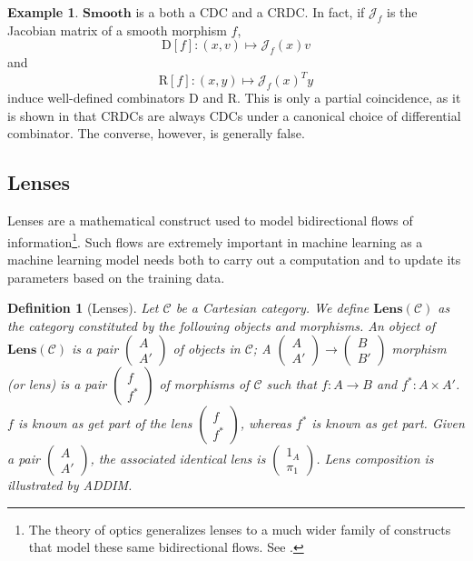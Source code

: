 \documentclass[11pt,a4paper,openright,twoside]{report}
\theoremstyle{plain}
\newtheorem{definition}[proposition]{Definition}
\theoremstyle{definition}
\newtheorem{example}[proposition]{Example}
\begin{document}
\begin{example}
  $\mathbf{Smooth}$ is a both a CDC and a CRDC. In fact, if $\mathcal{J}_f$ is the Jacobian matrix of a smooth morphism $f$,
  \[\mathrm{D}[f]: (x,v) \mapsto \mathcal{J}_f(x)v\]
  and
  \[\mathrm{R}[f]: (x,y) \mapsto \mathcal{J}_f(x)^Ty\]
  induce well-defined combinators $\mathrm{D}$ and $\mathrm{R}$. This is only a partial coincidence, as it is shown in \cite{cockettReverseDerivativeCategories2019} that CRDCs are always CDCs under a canonical choice of differential combinator. The converse, however, is generally false.
\end{example}



\subsection{Lenses}\label{subsec: lenses}

Lenses are a mathematical construct used to model bidirectional flows of information\footnote{The theory of optics generalizes lenses to a much wider family of constructs that model these same bidirectional flows. See \cite{rileyCategoriesOptics2018}.}. Such flows are extremely important in machine learning as a machine learning model needs both to carry out a computation and to update its parameters based on the training data.

\begin{definition}[Lenses]
  Let $\mathcal{C}$ be a Cartesian category. We define $\mathbf{Lens}(\mathcal{C})$ as the category constituted by the following objects and morphisms.
  An object of $\mathbf{Lens}(\mathcal{C})$ is a pair $\left(\begin{smallmatrix} A \\ A' \end{smallmatrix}\right)$ of objects in $\mathcal{C}$; 
  A $\left(\begin{smallmatrix} A \\ A' \end{smallmatrix}\right) \to \left(\begin{smallmatrix} B \\ B' \end{smallmatrix}\right)$ morphism (or lens) is a pair $\left(\begin{smallmatrix} f \\ f^* \end{smallmatrix}\right)$ of morphisms of $\mathcal{C}$ such that $f: A \to B$ and $f^*: A \times A'$. $f$ is known as get part of the lens $\left(\begin{smallmatrix} f \\ f^* \end{smallmatrix}\right)$, whereas $f^*$ is known as get part. Given a pair $\left(\begin{smallmatrix} A \\ A' \end{smallmatrix}\right)$, the associated identical lens is $\left(\begin{smallmatrix} 1_A \\ \pi_1 \end{smallmatrix}\right)$. Lens composition is illustrated by ADDIM.
\end{definition}
\end{document}

